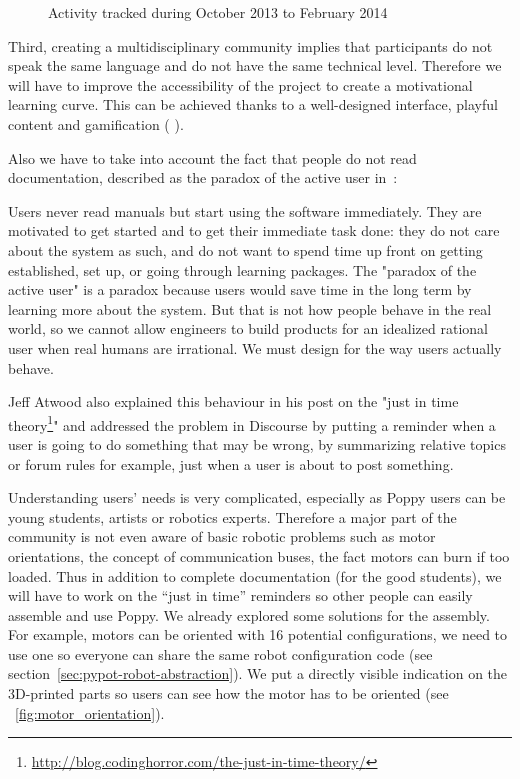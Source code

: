 \begin{figure}[tb]
\centering
    \hfil
    \caption{Activity tracked during October 2013 to February 2014}
    \label{fig:poppy_community}
\end{figure}


Third, creating a multidisciplinary community implies that participants do not speak the same language and do not have the same technical level. Therefore we will have to improve the accessibility of the project to create a motivational learning curve. This can be achieved thanks to a well-designed interface, playful content and gamification (\cite{deterding2011game} \cite{groh2012gamification}).

Also we have to take into account the fact that people do not read documentation, described as the paradox of the active user in~\parencite{carroll1987paradox}:
\begin{formal}
    Users never read manuals but start using the software immediately. They are motivated to get started and to get their immediate task done: they do not care about the system as such, and do not want to spend time up front on getting established, set up, or going through learning packages.
    The "paradox of the active user" is a paradox because users would save time in the long term by learning more about the system. But that is not how people behave in the real world, so we cannot allow engineers to build products for an idealized rational user when real humans are irrational. We must design for the way users actually behave.
\end{formal}

Jeff Atwood also explained this behaviour in his post on the "just in time theory\footnote{\url{http://blog.codinghorror.com/the-just-in-time-theory/}}" and addressed the problem in Discourse by putting a reminder when a user is going to do something that may be wrong, by summarizing relative topics or forum rules for example, just when a user is about to post something.

Understanding users’ needs is very complicated, especially as Poppy users can be young students, artists or robotics experts. Therefore a major part of the community is not even aware of basic robotic problems such as motor orientations, the concept of communication buses, the fact motors can burn if too loaded. Thus in addition to complete documentation (for the good students), we will have to work on the “just in time” reminders so other people can easily assemble and use Poppy.
We already explored some solutions for the assembly. For example, motors can be oriented with 16 potential configurations, we need to use one so everyone can share the same robot configuration code (see section~\ref{sec:pypot-robot-abstraction}). We put a directly visible indication on the 3D-printed parts so users can see how the motor has to be oriented (see \figurename~\ref{fig:motor_orientation}).

